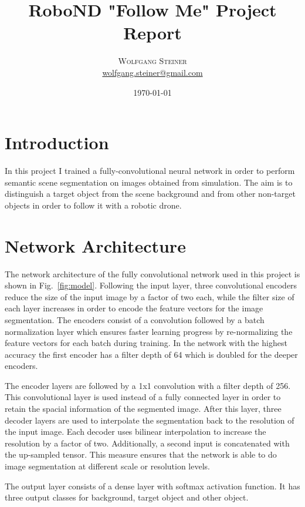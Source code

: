 \documentclass[twoside, twocolumn]{article}
\title{RoboND "Follow Me" Project Report   } %
\author{%
\textsc{Wolfgang Steiner} \\[0.5ex] %
\normalsize \href{mailto:wolfgang.steiner@gmail.com}{wolfgang.steiner@gmail.com} %
}
\date{\today} %
\newcommand{\figref}[1]{Fig.~\ref{fig:#1}}
\begin{document}
\maketitle

\section{Introduction}
In this project I trained a fully-convolutional neural network in order to
perform semantic scene segmentation on images obtained from simulation. The
aim is to distinguish a target object from the scene background and from other
non-target objects in order to follow it with a robotic drone.

\section{Network Architecture}
The network architecture of the fully convolutional network used in this project
is shown in \figref{model}. Following the input layer, three convolutional encoders reduce
the size of the input image by a factor of two each, while the filter size of each
layer increases in order to encode the feature vectors for the image segmentation.
The encoders consist of a convolution followed by a batch normalization layer which
ensures faster learning progress by re-normalizing the feature vectors for each
batch during training. In the network with the highest accuracy the first encoder
has a filter depth of 64 which is doubled for the deeper encoders.

The encoder layers are followed by a 1x1 convolution with a filter depth of
256. This convolutional layer is used instead of a fully connected layer in order
to retain the spacial information of the segmented image.
After this layer, three decoder layers are used to interpolate the segmentation
back to the resolution of the input image. Each decoder uses bilinear interpolation
to increase the resolution by a factor of two. Additionally, a second input is
concatenated with the up-sampled tensor. This measure ensures that the network is
able to do image segmentation at different scale or resolution levels.

The output layer consists of a dense layer with softmax activation function. It has
three output classes for background, target object and other object.
\end{document}
